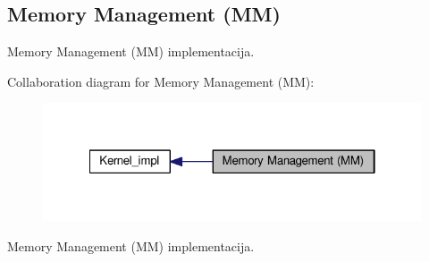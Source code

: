 \hypertarget{group__mm__impl}{\subsection{Memory Management (M\-M)}
\label{group__mm__impl}
}


Memory Management (M\-M) implementacija.  


Collaboration diagram for Memory Management (M\-M)\-:\nopagebreak
\begin{figure}[H]
\begin{center}
\leavevmode
\includegraphics[width=322pt]{group__mm__impl}
\end{center}
\end{figure}
Memory Management (M\-M) implementacija. 